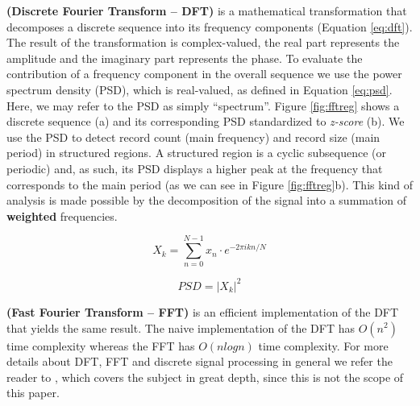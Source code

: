 \begin{definition}\textbf{(Discrete Fourier Transform -- DFT)}\label{def:dft} is
a mathematical transformation that decomposes a discrete sequence into its frequency components
(Equation \ref{eq:dft}). The result of the transformation is complex-valued, the
real part represents the amplitude and the imaginary part represents the phase.
To evaluate the contribution of a frequency component in the overall sequence we
use the power spectrum density (PSD), which is real-valued, as defined in
Equation \ref{eq:psd}. Here, we may refer to the PSD as simply ``spectrum''.
Figure \ref{fig:fftreg} shows a discrete sequence (a) and its corresponding PSD
standardized to \textit{z-score} (b). We use the PSD to detect record count
(main frequency) and record size (main period) in structured regions. A
structured region is a cyclic subsequence (or periodic) and, as such, its PSD
displays a higher peak at the frequency that corresponds to the main period (as
we can see in Figure \ref{fig:fftreg}b). This kind of analysis is made possible
by the decomposition of the signal into a summation of \textbf{weighted}
frequencies.

\begin{small}
\begin{equation}\label{eq:dft}
    X_k=\sum_{n=0}^{N-1}{x_n\cdot e^{-2\pi ikn/N}}    
\end{equation}

\begin{equation}\label{eq:psd}
    PSD=|X_k|^2
\end{equation}
\end{small}

\end{definition}

\vspace{-0.7cm}
\begin{definition}\textbf{(Fast Fourier Transform -- FFT)}\label{def:fft} is an
efficient implementation of the DFT that yields the same result. The naive implementation
of the DFT has $O(n^2)$ time complexity whereas the FFT has $O(nlogn)$ time
complexity. For more details about DFT, FFT and discrete signal
processing in general we refer the reader to \cite{oppenheim1989discrete},
which covers the subject in great depth, since this is not the scope of this
paper.
\end{definition}

